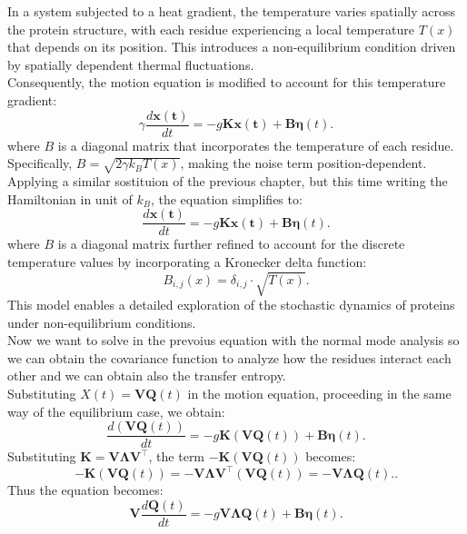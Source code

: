 \documentclass[English, Lau, oneside]{sapthesis}
\begin{document}
In a system subjected to a heat gradient, the temperature varies spatially across the protein structure, with each residue experiencing a local temperature \( T(x) \) that depends on its position.
This introduces a non-equilibrium condition driven by spatially dependent thermal fluctuations.\\ 
Consequently, the motion equation is modified to account for this temperature gradient:
\begin{equation}
    \gamma \frac{d\mathbf{x(t)}}{dt} = - g \mathbf{K} \mathbf{x(t)} + \mathbf{B} \boldsymbol{\eta}(t).
\end{equation}
where \( B \) is a diagonal matrix that incorporates the temperature of each residue. Specifically, \( B = \sqrt{2 \gamma k_B T(x)} \), making the noise term position-dependent.\\ 
Applying a similar sostituion of the previous chapter, but this time writing the Hamiltonian in unit of $k_B$, the equation simplifies to:
\begin{equation}
    \frac{d\mathbf{x(t)}}{dt} = - g \mathbf{K} \mathbf{x(t)} + \mathbf{B} \boldsymbol{\eta}(t).
\end{equation}
where \( B \) is a diagonal matrix further refined to account for the discrete temperature values by incorporating a Kronecker delta function:\\
\begin{equation}
    B_{i,j}(x) = \delta_{i,j} \cdot \sqrt{T(x)}.
\end{equation}
This model enables a detailed exploration of the stochastic dynamics of proteins under non-equilibrium conditions.\\
Now we want to solve in the prevoius equation with the normal mode analysis so we can obtain the covariance function to analyze how the residues interact each other and we can obtain also the transfer entropy.\\
Substituting \(X(t) = \mathbf{V} \mathbf{Q}(t)\) in the motion equation, proceeding in the same way of the equilibrium case, we obtain:
\[
\frac{d(\mathbf{V} \mathbf{Q}(t))}{dt} = -g \mathbf{K} (\mathbf{V} \mathbf{Q}(t)) + \mathbf{B} \mathbf{\eta}(t).
\]
Substituting \(\mathbf{K} = \mathbf{V} \mathbf{\Lambda} \mathbf{V}^\top\), the term \(-\mathbf{K}(\mathbf{V} \mathbf{Q}(t))\) becomes:
\[
-\mathbf{K}(\mathbf{V} \mathbf{Q}(t)) = -\mathbf{V} \mathbf{\Lambda} \mathbf{V}^\top (\mathbf{V} \mathbf{Q}(t))= - \mathbf{V} \mathbf{\Lambda} \mathbf{Q}(t)..
\]
Thus the equation becomes:
\[
\mathbf{V} \frac{d\mathbf{Q}(t)}{dt} = - g \mathbf{V} \mathbf{\Lambda} \mathbf{Q}(t) + \mathbf{B} \mathbf{\eta}(t).
\]
\end{document}
